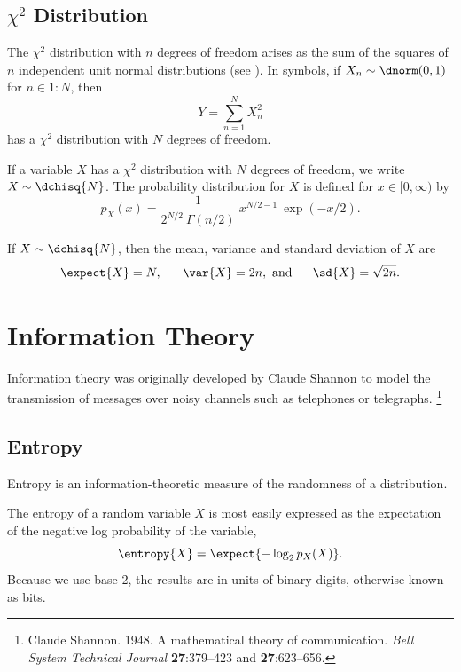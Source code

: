 \subsection{$\chi^2$ Distribution}\label{section:stats-chi-squared-distribution}

The $\chi^2$ distribution with $n$ degrees of freedom arises as the
sum of the squares of $n$ independent unit normal distributions (see
).  In symbols, if $X_n \sim \dnorm(0,1)$
for $n \in 1{:}N$, then 
%
\begin{equation}
Y = \sum_{n=1}^N X_n^2
\end{equation}
%
has a $\chi^2$ distribution with $N$ degrees of freedom.

If a variable $X$ has a $\chi^2$ distribution with $N$ degrees of
freedom, we write $X \sim \dchisq{N}$.  The probability distribution
for $X$ is defined for $x \in [0,\infty)$ by
%
\begin{equation}
p_X(x) = \frac{1}{2^{N/2} \ \Gamma(n/2)} \ x^{N/2-1} \ \exp(-x/2).
\end{equation}
%

If $X \sim \dchisq{N}$, then the mean, variance and standard deviation of $X$ are
%
\begin{equation}
\expect{X} = N,
\ \ \ \ \ 
\var{X} = 2n, \mbox{ and}
\ \ \ \ \  
\sd{X} = \sqrt{2n}.
\end{equation}


\section{Information Theory}\label{section:stats-information-theory}

Information theory was originally developed by Claude Shannon to model
the transmission of messages over noisy channels such as telephones
or telegraphs.%
%
\footnote{Claude Shannon. 1948.  A mathematical theory of
  communication.  {\it Bell System Technical Journal} {\bf
    27}:379--423 and {\bf 27}:623--656.}

\subsection{Entropy}\label{section:stats-entropy}

Entropy is an information-theoretic measure of the randomness of a
distribution.  


The entropy of a random variable $X$ is most easily expressed as the
expectation of the negative log probability of the variable,
%
\begin{equation}
\entropy{X} = \expect{- \log_2 p_X(X)}.
\end{equation}
%
Because we use base 2, the results are in units of binary digits,
otherwise known as bits.

